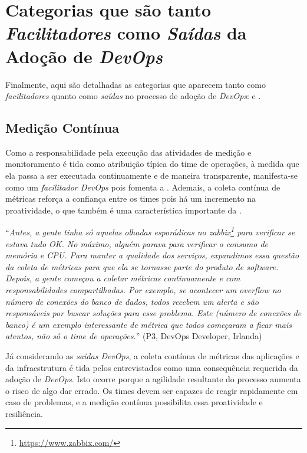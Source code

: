 \section{Categorias que são tanto \emph{Facilitadores} como \emph{Saídas} da Adoção de \emph{DevOps}}\label{secao_facilitadores_e_saidas}

Finalmente, aqui são detalhadas as categorias que aparecem tanto como
\emph{facilitadores} quanto como \emph{saídas} no processo de adoção de
{\it DevOps}:  e .


\subsection{Medição Contínua}

Como a responsabilidade pela execução das atividades de medição e monitoramento
é tida como atribuição típica do time de operações, à medida que ela passa a
ser executada continuamente e de maneira transparente, manifesta-se como um
\emph{facilitador DevOps} pois fomenta a \cc. Ademais, a coleta
contínua de métricas reforça a confiança entre os times pois há um incremento
na proatividade, o que também é uma característica importante da \cc.

\begin{mq}
``\emph{Antes, a gente tinha só aquelas olhadas esporádicas no zabbix\footnote{\url{https://www.zabbix.com/}}
para verificar se estava tudo OK. No máximo, alguém parava para verificar o
consumo de memória e CPU. Para manter a qualidade dos serviços, expandimos essa
questão da coleta de métricas para que ela se tornasse parte do produto de
software. Depois, a gente começou a coletar métricas continuamente e com
responsabilidades compartilhadas. Por exemplo, se acontecer um overflow no
número de conexões do banco de dados, todos recebem um alerta e são responsáveis
por buscar soluções para esse problema. Este (número de conexões de banco) é um
exemplo interessante de métrica que todos começaram a ficar mais atentos, não
só o time de operações.}''
(P3, DevOps Developer, Irlanda)
\end{mq}

Já considerando as \emph{saídas DevOps}, a coleta contínua de métricas das
aplicações e da infraestrutura é tida pelos entrevistados como uma consequência
requerida da adoção de {\it DevOps}. Isto ocorre porque a agilidade resultante
do processo aumenta o risco de algo dar errado. Os times devem ser capazes de
reagir rapidamente em caso de problemas, e a medição contínua possibilita essa
proatividade e resiliência.

